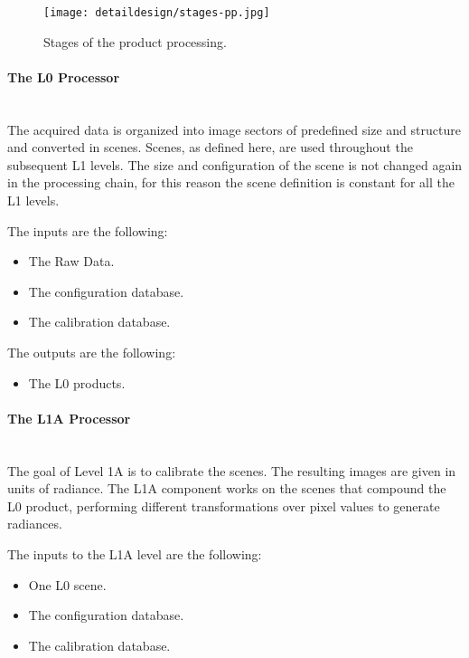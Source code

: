 \begin{figure}[!h]
\begin{center}
\texttt{[image: detaildesign/stages-pp.jpg]}
\caption{Stages of the product processing.}
\label{fig:cloud-states-pp}
\end{center}
\end{figure}

\paragraph{The L0 Processor}~\\

The acquired data is organized into image sectors of predefined size and structure and converted in scenes. Scenes, as defined here, are used throughout the subsequent L1 levels. The size and configuration of the scene is not changed again in the processing chain, for this reason the scene definition is constant for all the L1 levels.

The inputs are the following:
\begin{itemize}
\item The Raw Data.
\item The configuration database.
\item The calibration database.
\end{itemize}
The outputs are the following:
\begin{itemize}
\item The L0 products.
\end{itemize}

\paragraph{The L1A Processor}~\\

The goal of Level 1A is to calibrate the scenes. The resulting images are given in units of radiance.
The L1A component works on the scenes that compound the L0 product, performing different transformations over pixel values to generate radiances.

The inputs to the L1A level are the following:
\begin{itemize}
\item One L0 scene.
\item The configuration database.
\item The calibration database.
\end{itemize}

